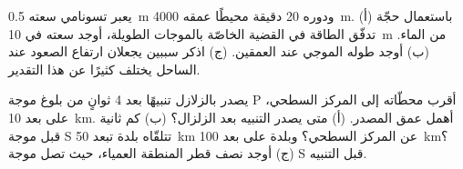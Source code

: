 \begin{exercise}[$\star\star\star$]\label{exo:b2:geological-hazards:11}
يعبر تسونامي سعته \qty{0.5}{m} ودوره 20 دقيقة محيطًا عمقه \qty{4000}{m}. (أ)
باستعمال حجّة تدفّق الطاقة في القضية الخاصّة بالموجات الطويلة، أوجد سعته في \qty{10}{m}
من الماء. (ب) أوجد طوله الموجي عند العمقين. (ج) اذكر سببين يجعلان ارتفاع الصعود عند الساحل
يختلف كثيرًا عن هذا التقدير.
\end{exercise}

\begin{exercise}[$\star\star\star$]\label{exo:b2:geological-hazards:12}
يصدر  بالزلازل تنبيهًا بعد 4 ثوانٍ من بلوغ موجة P أقرب محطّاته
إلى المركز السطحي، على بعد \qty{10}{km}. أهمل عمق المصدر. (أ) متى
يصدر التنبيه بعد الزلزال؟ (ب) كم ثانية قبل موجة S تتلقّاه بلدة تبعد \qty{50}{km}
عن المركز السطحي؟ وبلدة على بعد \qty{100}{km}؟ (ج) أوجد نصف قطر المنطقة العمياء، حيث
تصل موجة S قبل التنبيه.
\end{exercise}

